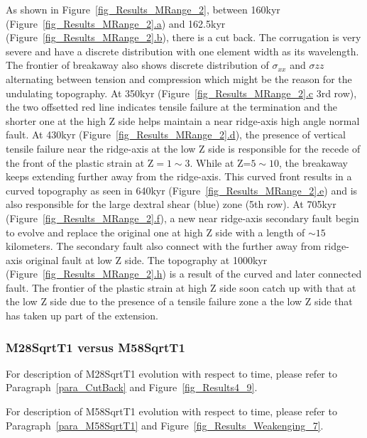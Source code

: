 As shown in Figure~\hyperref[fig_Results_MRange_2]{\ref{fig_Results_MRange_2}}, between 160kyr (Figure~\hyperref[fig_Results_MRange_2]{\ref{fig_Results_MRange_2}.a}) and 162.5kyr (Figure~\hyperref[fig_Results_MRange_2]{\ref{fig_Results_MRange_2}.b}), there is a cut back. The corrugation is very severe and have a discrete distribution with one element width as its wavelength. The frontier of breakaway also shows discrete distribution of $\sigma_{xx}$ and $\sigma{zz}$ alternating between tension and compression which might be the reason for the undulating topography. At 350kyr (Figure~\hyperref[fig_Results_MRange_2]{\ref{fig_Results_MRange_2}.c} 3rd row), the two offsetted red line indicates tensile failure at the termination and the shorter one at the high Z side helps maintain a near ridge-axis high angle normal fault. At 430kyr (Figure~\hyperref[fig_Results_MRange_2]{\ref{fig_Results_MRange_2}.d}), the presence of vertical tensile failure near the ridge-axis at the low Z side is responsible for the recede of the front of the plastic strain at Z$=1\sim3$. While at Z=$5\sim10$, the breakaway keeps extending further away from the ridge-axis. This curved front results in a curved topography as seen in 640kyr (Figure~\hyperref[fig_Results_MRange_2]{\ref{fig_Results_MRange_2}.e}) and is also responsible for the large dextral shear (blue) zone (5th row). At 705kyr (Figure~\hyperref[fig_Results_MRange_2]{\ref{fig_Results_MRange_2}.f}), a new near ridge-axis secondary fault begin to evolve and replace the original one at high Z side with a length of $\sim15$ kilometers. The secondary fault also connect with the further away from ridge-axis original fault at low Z side. The topography at 1000kyr (Figure~\hyperref[fig_Results_MRange_2]{\ref{fig_Results_MRange_2}.h}) is a result of the curved and later connected fault. The frontier of the plastic strain at high Z side soon catch up with that at the low Z side due to the presence of a tensile failure zone a the low Z side that has taken up part of the extension.
       
\subsubsection{M28SqrtT1 versus M58SqrtT1}
For description of M28SqrtT1 evolution with respect to time, please refer to Paragraph~\hyperref[para_CutBack]{\ref{para_CutBack}} and Figure~\hyperref[fig_Results4_9]{\ref{fig_Results4_9}}.

For description of M58SqrtT1 evolution with respect to time, please refer to Paragraph~\hyperref[para_M58SqrtT1]{\ref{para_M58SqrtT1}} and Figure~\hyperref[fig_Results_Weakenging_7]{\ref{fig_Results_Weakenging_7}}.



